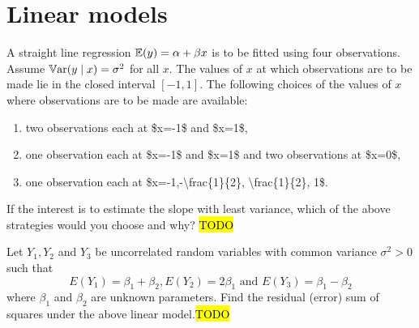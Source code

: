 
\chapter{Linear models \label{chap:linearModels}}
\begin{example}
\label{exa:isi2006samplepsb11}A straight line regression $\mathbb{E}(y)=\alpha+\beta x$
is to be fitted using four observations. Assume $\mathbb{V\mathrm{ar}}(y\mid x)=\sigma^{2}$
for all $x$. The values of $x$ at which observations are to be made
lie in the closed interval $[-1,1]$. The following choices of the
values of $x$ where observations are to be made are available:
\end{example}

\begin{enumerate}
\item two observations each at \$x=-1\$ and \$x=1\$,
\item one observation each at \$x=-1\$ and \$x=1\$ and two observations
at \$x=0\$,
\item one observation each at \$x=-1,-\textbackslash frac\{1\}\{2\}, \textbackslash frac\{1\}\{2\},
1\$.
\end{enumerate}
If the interest is to estimate the slope with least variance, which
of the above strategies would you choose and why? \hl{TODO}
\begin{example}
\label{exa:isi2007samplepsb12}Let $Y_{1},Y_{2}$ and $Y_{3}$ be
uncorrelated random variables with common variance $\sigma^{2}>0$
such that 
\[
E\left(Y_{1}\right)=\beta_{1}+\beta_{2},E\left(Y_{2}\right)=2\beta_{1}\text{ and }E\left(Y_{3}\right)=\beta_{1}-\beta_{2}
\]
 where $\beta_{1}$ and $\beta_{2}$ are unknown parameters. Find
the residual (error) sum of squares under the above linear model.\hl{TODO}
\end{example}


